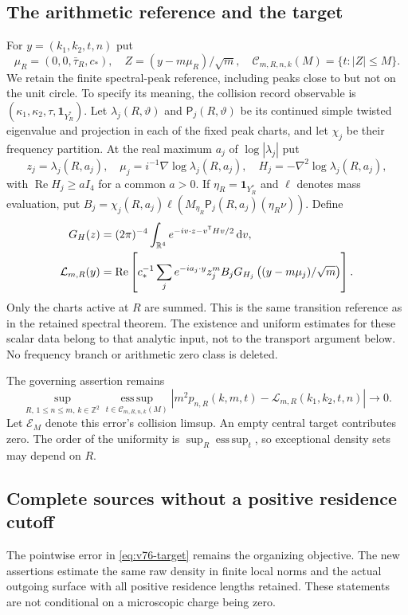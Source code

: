 \documentclass[11pt,reqno]{amsart}
\numberwithin{equation}{section}
\theoremstyle{definition}
\theoremstyle{remark}\newtheorem{remark}[theorem]{Remark}
\newcommand{\R}{\mathbb R}\newcommand{\Z}{\mathbb Z}
\newcommand{\one}{\mathbf1}\newcommand{\dd}{\,\mathrm d}
\newcommand{\esssup}{\operatorname*{ess\,sup}}
\begin{document}
\subsection{The arithmetic reference and the target}
For $y=(k_1,k_2,t,n)$ put
\[
 \mu_R=(0,0,\bar\tau_R,c_*),\quad
 Z=(y-m\mu_R)/\sqrt m,\quad
 \mathcal C_{m,R,n,k}(M)=\{t:|Z|\le M\}.
\]
We retain the finite spectral-peak reference, including peaks close to
but not on the unit circle. To specify its meaning, the collision
record observable is $(\kappa_1,\kappa_2,\tau,\one_{Y_R^*})$.
Let $\lambda_j(R,\vartheta)$ and $\mathsf P_j(R,\vartheta)$ be its
continued simple twisted eigenvalue and projection in each of the
fixed peak charts, and let $\chi_j$ be their frequency partition.
At the real maximum $a_j$ of $\log|\lambda_j|$ put
\[
 z_j=\lambda_j(R,a_j),\quad
 \mu_j=i^{-1}\nabla\log\lambda_j(R,a_j),\quad
 H_j=-\nabla^2\log\lambda_j(R,a_j),
\]
with $\operatorname{Re}H_j\ge aI_4$ for a common $a>0$. If
$\eta_R=\one_{Y_R^*}$ and $\ell$ denotes mass evaluation, put
$B_j=\chi_j(R,a_j)\ell(M_{\eta_R}\mathsf P_j(R,a_j)(\eta_R\nu))$.
Define
\begin{align}
 G_H(z)&=(2\pi)^{-4}\int_{\R^4}e^{-iv\cdot z-v^{\mathsf T}Hv/2}\dd v,
 \notag\\
 \mathcal L_{m,R}(y)&=\operatorname{Re}\left[
 c_*^{-1}\sum_j e^{-ia_j\cdot y}z_j^m B_j
      G_{H_j}\left((y-m\mu_j)/\sqrt m\right)\right].
 \label{eq:v76-reference}
\end{align}
Only the charts active at $R$ are summed. This is the same transition
reference as in the retained spectral theorem. The existence and
uniform estimates for these scalar data belong to that analytic
input, not to the transport argument below. No frequency branch or
arithmetic zero class is deleted.

The governing assertion remains
\begin{equation}\label{eq:v76-target}
 \sup_{R,\,1\le n\le m,\,k\in\Z^2}
 \esssup_{t\in\mathcal C_{m,R,n,k}(M)}
 |m^2p_{n,R}(k,m,t)-\mathcal L_{m,R}(k_1,k_2,t,n)|\longrightarrow0.
\end{equation}
Let $\mathcal E_M$ denote this error's collision limsup. An empty
central target contributes zero. The order of the uniformity is
$\sup_R\esssup_t$, so exceptional density sets may depend on $R$.


\subsection{Complete sources without a positive residence cutoff}
The pointwise error in \eqref{eq:v76-target} remains the organizing
objective. The new assertions estimate the same raw density in finite
local norms and the actual outgoing surface with all positive residence
lengths retained. These statements are not conditional on a microscopic
charge being zero.
\end{document}
